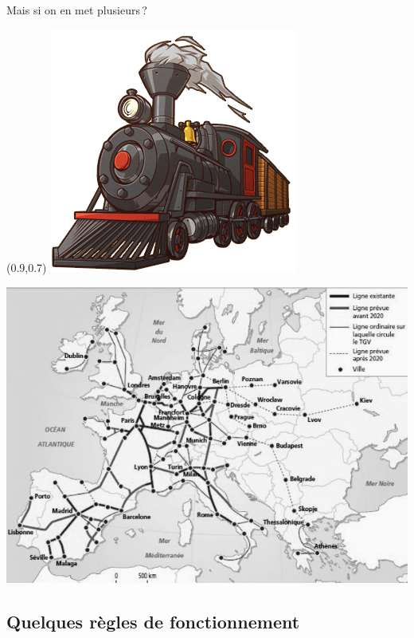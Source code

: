 \begin{frame}{Mais si on en met plusieurs ?}
  \begin{textblock*}{0.25\textwidth}(0.9\textwidth,0.7\textheight)
    \includegraphics[width=\textwidth]{concepts/trainwestern.png}
  \end{textblock*}
  \centering
  \includegraphics[height=0.8\textheight]{concepts/europe.jpg}
\end{frame}

\subsection{Quelques règles de fonctionnement}

